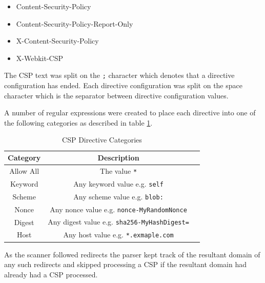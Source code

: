 \documentclass{mscreport}
\begin{document}
\begin{itemize}
	\setlength\itemsep{0.1em}
	\item Content-Security-Policy
	\item Content-Security-Policy-Report-Only
	\item X-Content-Security-Policy
	\item X-Webkit-CSP
\end{itemize}

\noindent
The CSP text was split on the \texttt{;} character which denotes that a directive configuration has ended. Each directive configuration was split on the space character which is the separator between directive configuration values.

\vspace{0.3cm} \noindent
A number of regular expressions were created to place each directive into one of the following categories as described in table \ref{table:directive_categories}.

\newpage

\begin{table}[t]
  \begin{center}
    \begin{tabular}{|c|c|c|}  %
      \hline
      \textbf{Category} & \textbf{Description}\\
      \hline
      Allow All & The value \texttt{*}\\
      \hline
      Keyword & Any keyword value e.g. \texttt{self}\\
      \hline
      Scheme & Any scheme value e.g. \texttt{blob:}\\
      \hline
      Nonce & Any nonce value e.g. \texttt{nonce-MyRandomNonce}\\
      \hline
      Digest & Any digest value e.g. \texttt{sha256-MyHashDigest=}\\
      \hline
      Host & Any host value e.g. \texttt{*.exmaple.com}\\
      \hline
    \end{tabular}
    \caption{CSP Directive Categories}
    \label{table:directive_categories} %
  \end{center}
\end{table}

\vspace{0.3cm} \noindent
As the scanner followed redirects the parser kept track of the resultant domain of any such redirects and skipped processing a CSP if the resultant domain had already had a CSP processed.
\end{document}
